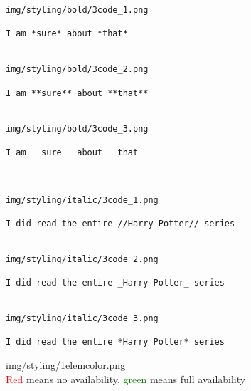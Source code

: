 \documentclass[12pt]{article}
\begin{document}
\begin{verbatim}
img/styling/bold/3code_1.png

I am *sure* about *that*


img/styling/bold/3code_2.png

I am **sure** about **that**


img/styling/bold/3code_3.png

I am __sure__ about __that__



img/styling/italic/3code_1.png

I did read the entire //Harry Potter// series


img/styling/italic/3code_2.png

I did read the entire _Harry Potter_ series


img/styling/italic/3code_3.png

I did read the entire *Harry Potter* series

\end{verbatim}
\noindent
img/styling/1elemcolor.png\\[.25cm]
\textcolor{red}{Red} means no availability, \textcolor{green}{green} means full availability
\end{document}
